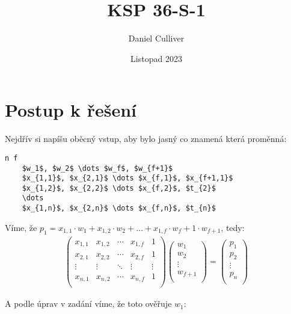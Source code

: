 \documentclass{../../../../ksp}
\title{KSP 36-S-1}
\author{Daniel Culliver}
\date{Listopad 2023}
\begin{document}
\maketitle

\section*{Postup k řešení}

Nejdřív si napíšu oběcný vstup, aby bylo jasný co znamená která proměnná:

\begin{Verbatim}[commandchars=\\\{\}, codes={\catcode`$=3\catcode`_=8}]
    n f
    $w_1$, $w_2$ \dots $w_f$, $w_{f+1}$
    $x_{1,1}$, $x_{2,1}$ \dots $x_{f,1}$, $x_{f+1,1}$
    $x_{1,2}$, $x_{2,2}$ \dots $x_{f,2}$, $t_{2}$
    \dots
    $x_{1,n}$, $x_{2,n}$ \dots $x_{f,n}$, $t_{n}$
\end{Verbatim}

Víme, že $p_1 = x_{1,1} \cdot w_{1} + x_{1,2} \cdot w_{2} + \dots + x_{1,f} \cdot w_{f} + 1 \cdot w_{f+1}$, tedy:
\begin{gather*}
    \begin{pmatrix}
        x_{1,1} & x_{1,2} & \cdots & x_{1,f} & 1\\
        x_{2,1} & x_{2,2} & \cdots & x_{2,f} & 1\\
        \vdots & \vdots & \ddots & \vdots & \vdots\\
        x_{n,1} & x_{n,2} & \cdots & x_{n,f} & 1\\
    \end{pmatrix}
    \begin{pmatrix}
        w_{1}\\
        w_{2}\\
        \vdots\\
        w_{f+1}\\
    \end{pmatrix}
    =
    \begin{pmatrix}
        p_{1}\\
        p_{2}\\
        \vdots\\
        p_{n}\\
    \end{pmatrix}
\end{gather*}

A podle úprav v zadání víme, že toto ověřuje $w_1$:
\end{document}
